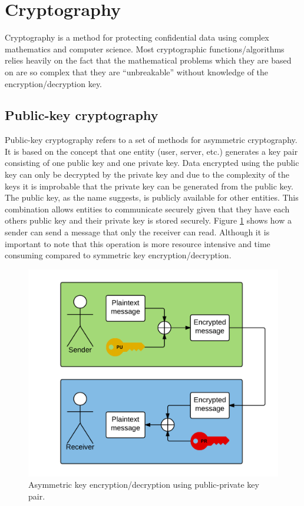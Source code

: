 \section{Cryptography}
Cryptography is a method for protecting confidential data using complex mathematics and computer science. Most cryptographic functions/algorithms relies heavily on the fact that the mathematical problems which they are based on are so complex that they are ``unbreakable'' without knowledge of the encryption/decryption key.

\subsection{Public-key cryptography}
\label{sec:publicKeyCrypto}
Public-key cryptography refers to a set of methods for asymmetric cryptography. It is based on the concept that one entity (user, server, etc.) generates a key pair consisting of one public key and one private key. Data encrypted using the public key can only be decrypted by the private key and due to the complexity of the keys it is improbable that the private key can be generated from the public key. The public key, as the name suggests, is publicly available for other entities. This combination allows entities to communicate securely given that they have each others public key and their private key is stored securely. Figure \ref{fig:encrypt_basic} shows how a sender can send a message that only the receiver can read. Although it is important to note that this operation is more resource intensive and time consuming compared to symmetric key encryption/decryption.

\begin{figure}[h!]
  \captionsetup{justification=centering,margin=1.5cm}
  \caption{Asymmetric key encryption/decryption using public-private key pair.}
  \label{fig:encrypt_basic}
  \centering
    \includegraphics[width=1\textwidth]{images/encrypt_basic.png}
\end{figure}

